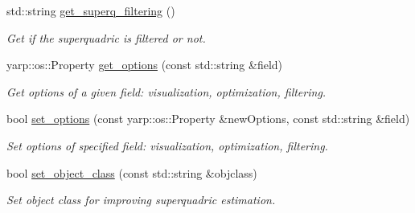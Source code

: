 \begin{DoxyCompactItemize}
std\+::string \mbox{\hyperlink{classSuperqModule_a66cb1b371b92687d851b5ca23174198b}{get\+\_\+superq\+\_\+filtering}} ()
\begin{DoxyCompactList}\small\item\em Get if the superquadric is filtered or not. \end{DoxyCompactList}\item 
yarp\+::os\+::\+Property \mbox{\hyperlink{classSuperqModule_a18822e0a99dc0b13479f20960c577fb9}{get\+\_\+options}} (const std\+::string \&field)
\begin{DoxyCompactList}\small\item\em Get options of a given field\+: visualization, optimization, filtering. \end{DoxyCompactList}\item 
bool \mbox{\hyperlink{classSuperqModule_a32ccf59ac0572ca77883237dd2d12890}{set\+\_\+options}} (const yarp\+::os\+::\+Property \&new\+Options, const std\+::string \&field)
\begin{DoxyCompactList}\small\item\em Set options of specified field\+: visualization, optimization, filtering. \end{DoxyCompactList}\item 
bool \mbox{\hyperlink{classSuperqModule_aa00f3e123ab12a0c65f864f2900c36e4}{set\+\_\+object\+\_\+class}} (const std\+::string \&objclass)
\begin{DoxyCompactList}\small\item\em Set object class for improving superquadric estimation. \end{DoxyCompactList}\end{DoxyCompactItemize}
